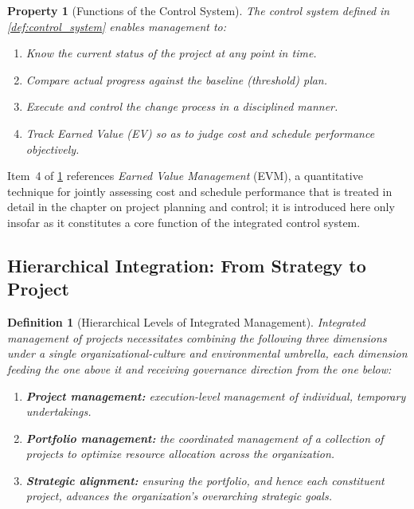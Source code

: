 \documentclass[12pt, a4paper]{report}
\theoremstyle{engnotes}
\newtheorem{defn}{Definition}[section]
\newtheorem{property}{Property}[section]
\begin{document}
\begin{property}[Functions of the Control System]\label{pty:control_system_functions}
    The control system defined in \cref{def:control_system} enables management to:
    \begin{enumerate}
        \item Know the current status of the project at any point in time.
        \item Compare actual progress against the baseline (threshold) plan.
        \item Execute and control the change process in a disciplined manner.
        \item Track Earned Value (EV) so as to judge cost and schedule performance objectively.
    \end{enumerate}
\end{property}

\begin{note}
    Item~4 of \cref{pty:control_system_functions} references \emph{Earned Value Management} (EVM), a quantitative technique for jointly assessing cost and schedule performance that is treated in detail in the chapter on project planning and control; it is introduced here only insofar as it constitutes a core function of the integrated control system.
\end{note}

\subsection{Hierarchical Integration: From Strategy to Project}
\label{subsec:hierarchical_integration}

\begin{defn}[Hierarchical Levels of Integrated Management]\label{def:hierarchical_levels}
    Integrated management of projects necessitates combining the following three dimensions under a single organizational-culture and environmental umbrella, each dimension feeding the one above it and receiving governance direction from the one below:
    \begin{enumerate}
        \item \textbf{Project management:} execution-level management of individual, temporary undertakings.
        \item \textbf{Portfolio management:} the coordinated management of a collection of projects to optimize resource allocation across the organization.
        \item \textbf{Strategic alignment:} ensuring the portfolio, and hence each constituent project, advances the organization's overarching strategic goals.
    \end{enumerate}
\end{defn}
\end{document}
